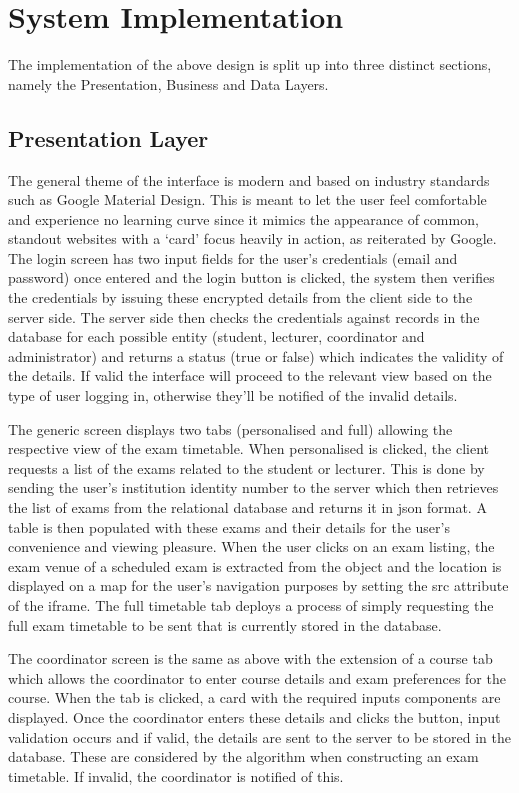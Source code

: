 \section{System Implementation}

The implementation of the above design is split up into three distinct sections, namely the Presentation, Business and Data Layers.

\subsection{Presentation Layer}

The general theme of the interface is modern and based on industry standards such as Google Material Design. This is meant to let the user feel comfortable and experience no learning curve since it mimics the appearance of common, standout websites with a ‘card’ focus heavily in action, as reiterated by Google.
The login screen has two input fields for the user’s credentials (email and password) once entered and the login button is clicked, the system then verifies the credentials by issuing these encrypted details from the client side to the server side. The server side then checks the credentials against records in the database for each possible entity (student, lecturer, coordinator and administrator) and returns a status (true or false) which indicates the validity of the details. If valid the interface will proceed to the relevant view based on the type of user logging in, otherwise they’ll be notified of the invalid details.

The generic screen displays two tabs (personalised and full) allowing the respective view of the exam timetable. When personalised is clicked, the client requests a list of the exams related to the student or lecturer. This is done by sending the user’s institution identity number to the server which then retrieves the list of exams from the relational database and returns it in json format. A table is then populated with these exams and their details for the user’s convenience and viewing pleasure. When the user clicks on an exam listing, the exam venue of a scheduled exam is extracted from the object and the location is displayed on a map for the user’s navigation purposes by setting the src attribute of the iframe. The full timetable tab deploys a process of simply requesting the full exam timetable to be sent that is currently stored in the database.

The coordinator screen is the same as above with the extension of a course tab which allows the coordinator to enter course details and exam preferences for the course. When the tab is clicked, a card with the required inputs components are displayed. Once the coordinator enters these details and clicks the button, input validation occurs and if valid, the details are sent to the server to be stored in the database. These are considered by the algorithm when constructing an exam timetable. If invalid, the coordinator is notified of this.

